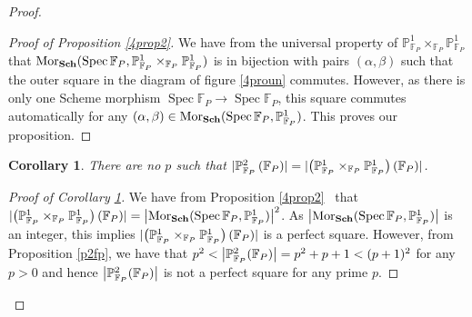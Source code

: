\documentclass[english,letter,doublesided]{article}
\DeclareMathOperator{\spec}{Spec}
\newcommand{\mor}{\mathrm{Mor}}
\DeclarePairedDelimiter\abs{\lvert}{\rvert}%
\newcommand{\FF}{\mathbb{F}}
\newcommand{\PP}{\mathbb{P}}
\newenvironment{subproof}[1][\proofname]{%
	\renewcommand{\qedsymbol}{$\blacksquare$}%
	\begin{proof}[#1]%
	}{%
	\end{proof}%
}
\newtheorem{cor}[thm]{Corollary}
\theoremstyle{remark}
\theoremstyle{definition}
\newcommand{\cat}[1]{{\mathrm{\bf{#1}}}}
\newcommand{\Fp}{{\FF_P}}
\begin{document}
\begin{proof}
\begin{subproof}[Proof of Proposition \ref{4prop2}]
We have from the universal property of $\PP^1_\Fp\times_\Fp\PP^1_\Fp$ that $\mor_{\cat{Sch}}(\spec \Fp,\PP^1_\Fp\times_\Fp\PP^1_\Fp)$ is in bijection with pairs $(\alpha,\beta)$ such that the outer square in the diagram of figure \ref{4proun} commutes. However, as there is only one Scheme morphism $\spec \Fp\to \spec \Fp$, this square commutes automatically for any $(\alpha,\beta)\in \mor_{\cat{Sch}}(\spec\Fp,\PP^1_\Fp)$. This proves our proposition.
\end{subproof}
\begin{cor}\label{4nop}
	There are no $p$ such that  $\abs{\PP_{\Fp}^2\left(\Fp\right)}=\abs{\left(\PP^1_\Fp\times_\Fp\PP^1_\Fp\right)(\Fp)}$.
\end{cor}
\begin{subproof}[Proof of Corollary \ref{4nop}]
	We have from Proposition \ref{4prop2}~ that $\abs{\left(\PP^1_\Fp\times_\Fp\PP^1_\Fp\right)(\Fp)}=\abs*{\mor_{\cat{Sch}}(\spec\Fp,\PP^1_\Fp)}^2$. As $\abs*{\mor_{\cat{Sch}}(\spec\Fp,\PP^1_\Fp)}$ is an integer, this implies $\abs{\left(\PP^1_\Fp\times_\Fp\PP^1_\Fp\right)(\Fp)}$ is a perfect square. However, from Proposition \ref{p2fp}, we have that $p^2<\abs*{\PP^2_\Fp(\Fp)}=p^2+p+1<(p+1)^2$ for any $p>0$ and hence $\abs*{\PP^2_\Fp(\Fp)}$ is not a perfect square for any prime $p$.
\end{subproof}
\end{proof}
\end{document}
